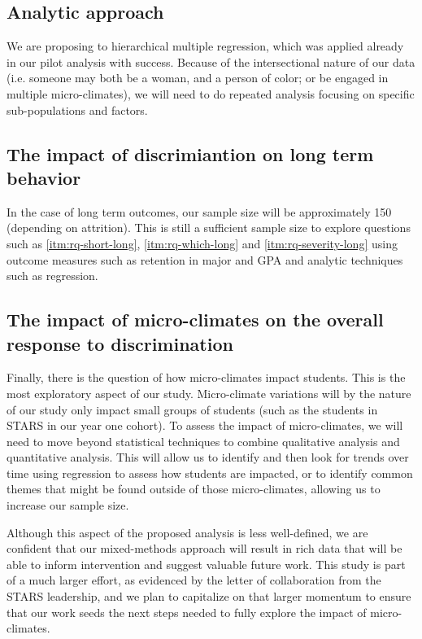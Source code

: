\subsection{Analytic approach}
We are proposing to hierarchical multiple regression, which was applied already in our pilot analysis with success. Because of the intersectional nature of our data (i.e. someone may both be a woman, and a person of color; or be engaged in multiple micro-climates), we will need to do repeated analysis focusing on specific sub-populations and factors. 


\subsection{The impact of discrimiantion on long term behavior}
In the case of long term outcomes, our sample size will be approximately 150 (depending on attrition). This is still a sufficient sample size to explore questions such as \ref{itm:rq-short-long}, \ref{itm:rq-which-long} and \ref{itm:rq-severity-long} using outcome measures such as retention in major and GPA and analytic techniques such as regression. 

\subsection{The impact of micro-climates on the overall response to discrimination}
Finally, there is the question of how micro-climates impact students. This is the most exploratory aspect of our study. Micro-climate variations will by the nature of our study only impact small groups of students (such as the  students in STARS in our year one cohort). To assess the impact of micro-climates, we will need to move beyond statistical techniques to combine qualitative analysis and quantitative analysis. This will allow us to identify and then look for trends over time using regression to assess how students are impacted, or to identify common themes that might be found outside of those micro-climates, allowing us to increase our sample size.

Although this aspect of the proposed analysis is less well-defined, we are confident that our mixed-methods approach will result in rich data that will be able to inform intervention and suggest valuable future work. This study is part of a much larger effort, as evidenced by the letter of collaboration from the STARS leadership, and we plan to capitalize on that larger momentum to ensure that our work seeds the next steps needed to fully explore the impact of micro-climates. 

